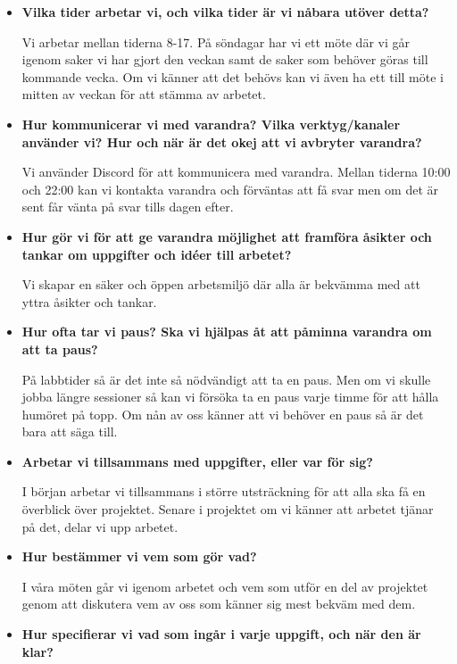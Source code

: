\documentclass{mall}
\begin{document}
\begin{itemize}
\item \textbf{Vilka tider arbetar vi, och vilka tider är vi nåbara utöver detta?}

Vi arbetar mellan tiderna 8-17. På söndagar har vi ett möte där vi går igenom saker vi har gjort den veckan samt de saker som behöver göras till kommande vecka. Om vi känner att det behövs kan vi även ha ett till möte i mitten av veckan för att stämma av arbetet.

\item \textbf{Hur kommunicerar vi med varandra? Vilka verktyg/kanaler använder vi? Hur och när är det okej att vi avbryter varandra?}

Vi använder Discord för att kommunicera med varandra. Mellan tiderna 10:00 och 22:00 kan vi kontakta varandra och förväntas att få svar men om det är sent får vänta på svar tills dagen efter.

\item \textbf{Hur gör vi för att ge varandra möjlighet att framföra åsikter och tankar om uppgifter och idéer till arbetet?}

Vi skapar en säker och öppen arbetsmiljö där alla är bekvämma med att yttra åsikter och tankar.

\item \textbf{Hur ofta tar vi paus? Ska vi hjälpas åt att påminna varandra om att ta paus?}

På labbtider så är det inte så nödvändigt att ta en paus. Men om vi skulle jobba längre sessioner så kan vi försöka ta en paus varje timme för att hålla humöret på topp. Om nån av oss känner att vi behöver en paus så är det bara att säga till.

\item \textbf{Arbetar vi tillsammans med uppgifter, eller var för sig?}

I början arbetar vi tillsammans i större utsträckning för att alla ska få en överblick över projektet. Senare i projektet om vi känner att arbetet tjänar på det, delar vi upp arbetet.

\item \textbf{Hur bestämmer vi vem som gör vad?}

I våra möten går vi igenom arbetet och vem som utför en del av projektet genom att diskutera vem av oss som känner sig mest bekväm med dem.

\item \textbf{Hur specifierar vi vad som ingår i varje uppgift, och när den är klar?}


\end{itemize}
\end{document}
